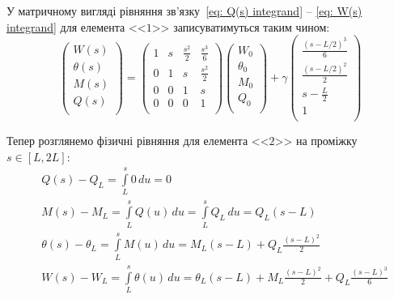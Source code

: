 \documentclass{mathreport}
\begin{document}
У матричному вигляді рівняння зв'язку~\eqref{eq: Q(s) integrand} -- \eqref{eq: W(s) integrand} для елемента <<$1$>> записуватимуться таким чином:
\begin{equation}\label{eq: field equations for element 1}
    \begin{pmatrix}
        W(s)      \\
        \theta(s) \\
        M(s)      \\
        Q(s)      \\
    \end{pmatrix} =
    \begin{pmatrix}
        1 & s & \frac{s^2}{2} & \frac{s^3}{6} \\
        0 & 1 & s & \frac{s^2}{2} \\
        0 & 0 & 1 & s \\
        0 & 0 & 0 & 1 \\
    \end{pmatrix}
    \begin{pmatrix}
        W_0      \\
        \theta_0 \\
        M_0      \\
        Q_0      \\
    \end{pmatrix} + \gamma
    \begin{pmatrix}
        \frac{(s-L/2)^3}{6} \\
        \frac{(s-L/2)^2}{2} \\
        s - \frac{L}{2}     \\
        1                   \\
    \end{pmatrix}
\end{equation} 

Тепер розглянемо фізичні рівняння для елемента <<$2$>> на проміжку $s \in [L,2L]$:
\begin{align}
    & Q(s)-Q_L = \int\limits_{L}^{s} 0\, du = 0 \\
    & M(s)-M_L = \int\limits_{L}^{s} Q(u)\, du = \int\limits_{L}^{s} Q_L\, du = Q_L (s-L) \\
    & \theta(s)-\theta_L = \int\limits_{L}^{s} M(u)\, du = M_L (s-L) + Q_L \frac{(s-L)^2}{2} \\
    & W(s)-W_L = \int\limits_{L}^{s} \theta(u)\, du = \theta_L (s-L) + M_L \frac{(s-L)^2}{2} + Q_L \frac{(s-L)^3}{6}
\end{align}
\end{document}
